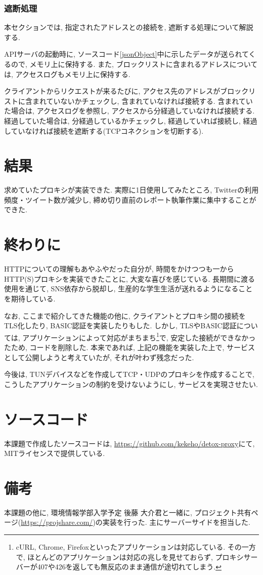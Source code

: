\documentclass[10pt,a4paper,uplatex,a4j,dvipdfmx]{jsarticle}
\begin{document}
\begin{multicols}{2}
    \subsubsection{遮断処理}
    本セクションでは, 指定されたアドレスとの接続を, 遮断する処理について解説する.
    
    APIサーバの起動時に, ソースコード\ref{jsonObject}中に示したデータが送られてくるので, メモリ上に保持する. また, ブロックリストに含まれるアドレスについては, アクセスログもメモリ上に保持する.

    クライアントからリクエストが来るたびに, アクセス先のアドレスがブロックリストに含まれていないかチェックし, 含まれていなければ接続する.
    含まれていた場合は, アクセスログを参照し, アクセスから分経過していなければ接続する. 経過していた場合は, 分経過しているかチェックし, 経過していれば接続し, 経過していなければ接続を遮断する(TCPコネクションを切断する).

    \section{結果}
    求めていたプロキシが実装できた.
    実際に1日使用してみたところ, Twitterの利用頻度・ツイート数が減少し, 締め切り直前のレポート執筆作業に集中することができた.
    
    \section{終わりに}
    HTTPについての理解もあやふやだった自分が, 時間をかけつつも一からHTTP(S)プロキシを実装できたことに, 大変な喜びを感じている.
    長期間に渡る使用を通じて, SNS依存から脱却し, 生産的な学生生活が送れるようになることを期待している.
    
    なお, ここまで紹介してきた機能の他に, クライアントとプロキシ間の接続をTLS化したり, BASIC認証を実装したりもした.
    しかし, TLSやBASIC認証については, アプリケーションによって対応がまちまち\footnote{cURL\cite{curlhttps}, Chrome\cite{chromehttps}, Firefox\cite{firefoxhttps}といったアプリケーションは対応している. その一方で, ほとんどのアプリケーションは対応の兆しを見せておらず, プロキシサーバーが407や426を返しても無反応のまま通信が途切れてしまう.}で, 安定した接続ができなかったため, コードを削除した. 本来であれば, 上記の機能を実装した上で, サービスとして公開しようと考えていたが, それが叶わず残念だった.

    今後は, TUNデバイスなどを作成してTCP・UDPのプロキシを作成することで, こうしたアプリケーションの制約を受けないようにし, サービスを実現させたい.

    \end{multicols}


  \printbibliography[title=参考文献]
  
  \section*{ソースコード}
  本課題で作成したソースコードは, \url{https://github.com/kekeho/detox-proxy}にて, MITライセンス\cite{detox:license}で提供している.
  
  \section*{備考}
  本課題の他に, 環境情報学部入学予定 後藤 大介君と一緒に, プロジェクト共有ページ(\url{https://projshare.com/})の実装を行った. 主にサーバーサイドを担当した.
\end{document}
